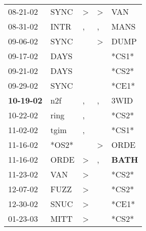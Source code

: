 \begin{supertabular}{p{0.07\textwidth}p{0.06\textwidth}p{0.02\textwidth}p{0.02\textwidth}p{0.06\textwidth}}
          08-21-02\textsuperscript{} &           SYNC\textsuperscript{} &     \textgreater &  \textgreater &            VAN\textsuperscript{} \\
          08-31-02\textsuperscript{} &           INTR\textsuperscript{} &                , &             , &           MANS\textsuperscript{} \\
          09-06-02\textsuperscript{} &           SYNC\textsuperscript{} &                  &  \textgreater &           DUMP\textsuperscript{} \\
          09-17-02\textsuperscript{} &           DAYS\textsuperscript{} &                  &               &                            *CS1* \\
          09-21-02\textsuperscript{} &           DAYS\textsuperscript{} &                  &               &                            *CS2* \\
          09-29-02\textsuperscript{} &           SYNC\textsuperscript{} &                  &               &                            *CE1* \\
 \textbf{10-19-02\textsuperscript{}} &            n2f\textsuperscript{} &                , &             , &           3WID\textsuperscript{} \\
          10-22-02\textsuperscript{} &           ring\textsuperscript{} &                , &               &                            *CS2* \\
          11-02-02\textsuperscript{} &           tgim\textsuperscript{} &                , &               &                            *CS1* \\
          11-16-02\textsuperscript{} &                            *OS2* &                  &  \textgreater &           ORDE\textsuperscript{} \\
          11-16-02\textsuperscript{} &           ORDE\textsuperscript{} &     \textgreater &             , &  \textbf{BATH\textsuperscript{}} \\
          11-23-02\textsuperscript{} &            VAN\textsuperscript{} &     \textgreater &               &                            *CS2* \\
          12-07-02\textsuperscript{} &           FUZZ\textsuperscript{} &     \textgreater &               &                            *CS2* \\
          12-30-02\textsuperscript{} &           SNUC\textsuperscript{} &     \textgreater &               &                            *CE1* \\
          01-23-03\textsuperscript{} &           MITT\textsuperscript{} &     \textgreater &               &                            *CS2* \\

\end{supertabular}
